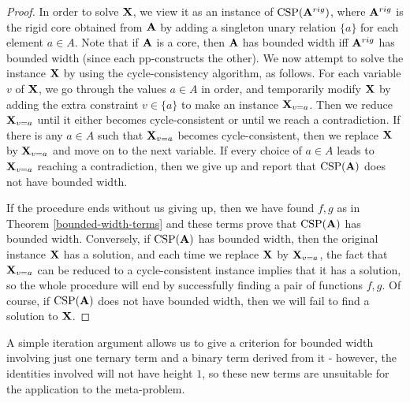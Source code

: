 \documentclass[letterpaper,11pt]{article}
\DeclareMathOperator{\CSP}{CSP}
\begin{document}
\begin{proof}
In order to solve $\mathbf{X}$, we view it as an instance of $\CSP(\fA^{rig})$, where $\mathbf{A}^{rig}$ is the rigid core obtained from $\mathbf{A}$ by adding a singleton unary relation $\{a\}$ for each element $a \in A$. Note that if $\mathbf{A}$ is a core, then $\mathbf{A}$ has bounded width iff $\mathbf{A}^{rig}$ has bounded width (since each pp-constructs the other). We now attempt to solve the instance $\mathbf{X}$ by using the cycle-consistency algorithm, as follows. For each variable $v$ of $\mathbf{X}$, we go through the values $a \in A$ in order, and temporarily modify $\mathbf{X}$ by adding the extra constraint $v \in \{a\}$ to make an instance $\mathbf{X}_{v=a}$. Then we reduce $\mathbf{X}_{v=a}$ until it either becomes cycle-consistent or until we reach a contradiction. If there is any $a \in A$ such that $\mathbf{X}_{v=a}$ becomes cycle-consistent, then we replace $\mathbf{X}$ by $\mathbf{X}_{v=a}$ and move on to the next variable. If every choice of $a \in A$ leads to $\mathbf{X}_{v=a}$ reaching a contradiction, then we give up and report that $\CSP(\fA)$ does not have bounded width.

If the procedure ends without us giving up, then we have found $f,g$ as in Theorem \ref{bounded-width-terms} and these terms prove that $\CSP(\fA)$ has bounded width. Conversely, if $\CSP(\fA)$ has bounded width, then the original instance $\mathbf{X}$ has a solution, and each time we replace $\mathbf{X}$ by $\mathbf{X}_{v=a}$, the fact that $\mathbf{X}_{v=a}$ can be reduced to a cycle-consistent instance implies that it has a solution, so the whole procedure will end by successfully finding a pair of functions $f,g$. Of course, if $\CSP(\fA)$ does not have bounded width, then we will fail to find a solution to $\mathbf{X}$.
\end{proof}


A simple iteration argument allows us to give a criterion for bounded width involving just one ternary term and a binary term derived from it - however, the identities involved will not have height $1$, so these new terms are unsuitable for the application to the meta-problem.
\end{document}
